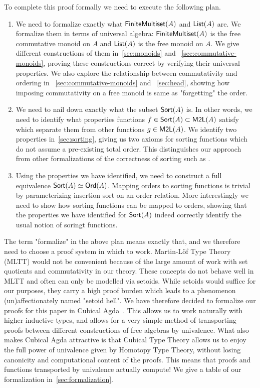 To complete this proof formally we need to execute the following plan.
\begin{enumerate}
    \item We need to formalize exactly what $\operatorname{\mathsf{FiniteMultiset}}(A)$ and $\operatorname{\mathsf{List}}(A)$ are.
    We formalize them in terms of universal algebra: $\operatorname{\mathsf{FiniteMultiset}}(A)$ is 
    the free commutative monoid on $A$ and $\operatorname{\mathsf{List}}(A)$ is the free monoid on $A$. We give
    different constructions of them in~\cref{sec:monoids} and ~\cref{sec:commutative-monoids},
    proving these constructions correct by verifying their universal properties.
    We also explore the relationship between commutativity and ordering in
    ~\cref{sec:commutative-monoids} and ~\cref{sec:head},
    showing how imposing commutativity on a free monoid is same as "forgetting" the order.
    \item We need to nail down exactly what the subset $\operatorname{\mathsf{Sort}}(A)$ is. In other words, we need to
    identify what properties functions $f \in \operatorname{\mathsf{Sort}}(A) \subset \operatorname{\mathsf{M2L}}(A)$ satisfy which separate
    them from other functions $g \in \operatorname{\mathsf{M2L}}(A)$. We identify two properties in~\cref{sec:sorting},
    giving us two axioms for sorting functions which do not assume a pre-existing total order. This distinguishes our approach 
    from other formalizations of the correctness of sorting such as 
    \cite{appelVerifiedFunctionalAlgorithms2023}.
    \item Using the properties we have identified, we need to construct a full equivalence
    $\operatorname{\mathsf{Sort}}(A) \simeq \operatorname{\mathsf{Ord}}(A)$. Mapping orders to sorting functions is
    trivial by parameterizing insertion sort on an order relation. More interestingly we need to show how sorting functions
    can be mapped to orders, showing that the properties we have identified for $\operatorname{\mathsf{Sort}}(A)$ indeed
    correctly identify the usual notion of soringt functions.
\end{enumerate}

The term "formalize" in the above plan means exactly that, and we therefore need to choose a proof system in which to work. Martin-L\"of Type Theory (MLTT) would not be convenient because of the large amount of work with set quotients and commutativity in our theory. These concepts do not behave well in MLTT and often can only be modelled via setoids. While setoids would suffice for
our purposes, they carry a high proof burden which leads to a
phenomenon (un)affectionately named "setoid hell". We have therefore decided to formalize our proofs
for this paper in Cubical Agda~\cite{vezzosiCubicalAgdaDependently2019}. This allows us to work  naturally with
higher inductive types, and allows for a very simple method of transporting proofs between
different constructions of free algebras by univalence. What also makes Cubical Agda attractive
is that Cubical Type Theory allows us to enjoy the full power of univalence given by Homotopy Type Theory, 
without losing canonicity and computational content of the proofs. This means that proofs and functions
transported by univalence actually compute!
We give a table of our formalization in~\cref{sec:formalization}.

